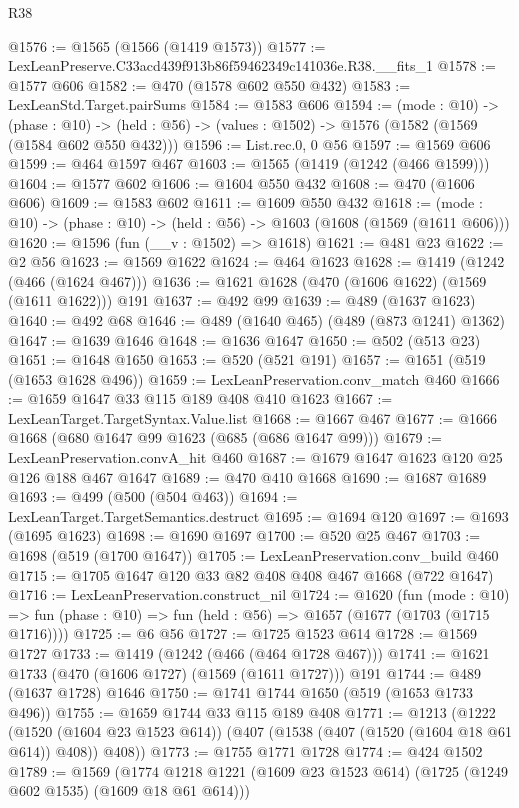 \begin{lexlean}{R38}
\begin{coremodule}
@1576 := @1565 (@1566 (@1419 @1573))
@1577 := LexLeanPreserve.C33acd439f913b86f59462349c141036e.R38.__fits_1
@1578 := @1577 @606
@1582 := @470 (@1578 @602 @550 @432)
@1583 := LexLeanStd.Target.pairSums
@1584 := @1583 @606
@1594 := (mode : @10) ->
  (phase : @10) -> (held : @56) -> (values : @1502) -> @1576 (@1582 (@1569 (@1584 @602 @550 @432)))
@1596 := List.rec.{0, 0} @56
@1597 := @1569 @606
@1599 := @464 @1597 @467
@1603 := @1565 (@1419 (@1242 (@466 @1599)))
@1604 := @1577 @602
@1606 := @1604 @550 @432
@1608 := @470 (@1606 @606)
@1609 := @1583 @602
@1611 := @1609 @550 @432
@1618 := (mode : @10) -> (phase : @10) -> (held : @56) -> @1603 (@1608 (@1569 (@1611 @606)))
@1620 := @1596 (fun (__v : @1502) => @1618)
@1621 := @481 @23
@1622 := @2 @56
@1623 := @1569 @1622
@1624 := @464 @1623
@1628 := @1419 (@1242 (@466 (@1624 @467)))
@1636 := @1621 @1628 (@470 (@1606 @1622) (@1569 (@1611 @1622))) @191
@1637 := @492 @99
@1639 := @489 (@1637 @1623)
@1640 := @492 @68
@1646 := @489 (@1640 @465) (@489 (@873 @1241) @1362)
@1647 := @1639 @1646
@1648 := @1636 @1647
@1650 := @502 (@513 @23)
@1651 := @1648 @1650
@1653 := @520 (@521 @191)
@1657 := @1651 (@519 (@1653 @1628 @496))
@1659 := LexLeanPreservation.conv_match @460
@1666 := @1659 @1647 @33 @115 @189 @408 @410 @1623
@1667 := LexLeanTarget.TargetSyntax.Value.list
@1668 := @1667 @467
@1677 := @1666 @1668 (@680 @1647 @99 @1623 (@685 (@686 @1647 @99)))
@1679 := LexLeanPreservation.convA_hit @460
@1687 := @1679 @1647 @1623 @120 @25 @126 @188 @467 @1647
@1689 := @470 @410 @1668
@1690 := @1687 @1689
@1693 := @499 (@500 (@504 @463))
@1694 := LexLeanTarget.TargetSemantics.destruct
@1695 := @1694 @120
@1697 := @1693 (@1695 @1623)
@1698 := @1690 @1697
@1700 := @520 @25 @467
@1703 := @1698 (@519 (@1700 @1647))
@1705 := LexLeanPreservation.conv_build @460
@1715 := @1705 @1647 @120 @33 @82 @408 @408 @467 @1668 (@722 @1647)
@1716 := LexLeanPreservation.construct_nil
@1724 := @1620
    (fun (mode : @10) =>
    fun (phase : @10) => fun (held : @56) => @1657 (@1677 (@1703 (@1715 @1716))))
@1725 := @6 @56
@1727 := @1725 @1523 @614
@1728 := @1569 @1727
@1733 := @1419 (@1242 (@466 (@464 @1728 @467)))
@1741 := @1621 @1733 (@470 (@1606 @1727) (@1569 (@1611 @1727))) @191
@1744 := @489 (@1637 @1728) @1646
@1750 := @1741 @1744 @1650 (@519 (@1653 @1733 @496))
@1755 := @1659 @1744 @33 @115 @189 @408
@1771 := @1213
    (@1222
      (@1520 (@1604 @23 @1523 @614))
      (@407 (@1538 (@407 (@1520 (@1604 @18 @61 @614)) @408)) @408))
@1773 := @1755 @1771 @1728
@1774 := @424 @1502
@1789 := @1569
    (@1774 @1218 @1221 (@1609 @23 @1523 @614) (@1725 (@1249 @602 @1535) (@1609 @18 @61 @614)))

\end{coremodule}
\end{lexlean}
